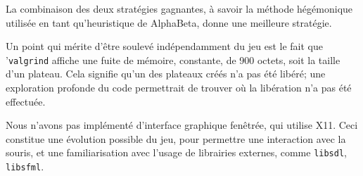 \documentclass[a4paper]{article}
\begin{document}
La combinaison des deux stratégies gagnantes, à savoir la méthode hégémonique 
utilisée en tant qu'heuristique de AlphaBeta, donne une meilleure stratégie.

Un point qui mérite d'être soulevé indépendamment du jeu est 
le fait que '\texttt{valgrind} affiche une fuite de mémoire, constante, de 900 
octets, soit la taille d'un plateau. Cela signifie qu'un des plateaux créés n'a 
pas été libéré; une exploration profonde du code permettrait de trouver où la 
libération n'a pas été effectuée.

Nous n'avons pas implémenté d'interface graphique fenêtrée, qui utilise X11. 
Ceci constitue une évolution possible du jeu, pour permettre une interaction 
avec la souris, et une familiarisation avec l'usage de librairies externes, 
comme \texttt{libsdl}, \texttt{libsfml}.

    
\end{document}

